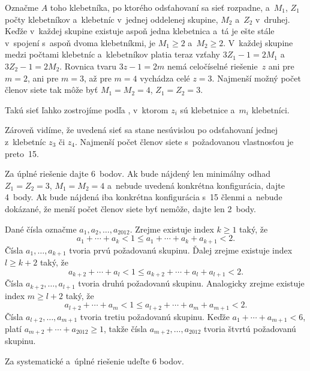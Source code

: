 {%
Označme $A$ toho klebetníka, po ktorého odsťahovaní sa sieť rozpadne, a~$M_1$, $Z_1$
počty klebetníkov a~klebetníc v~jednej oddelenej skupine, $M_2$ a~$Z_2$ v~druhej.
Keďže v~každej skupine existuje aspoň jedna klebetnica a~tá je
ešte stále v~spojení s~aspoň dvoma klebetníkmi, je
$M_1\ge2$ a~$M_2\ge2$. V~každej skupine medzi počtami klebetníc a~klebetníkov
platia teraz vzťahy $3Z_1-1=2M_1$ a~$3Z_2-1=2M_2$. Rovnica tvaru $3z-1=2m$
nemá celočíselné riešenie~$z$ ani pre $m=2$, ani pre
$m=3$, až pre $m=4$ vychádza celé $z=3$.
Najmenší možný počet členov siete tak môže byť $M_1=M_2=4$, $Z_1=Z_2=3$.

Takú sieť ľahko zostrojíme podľa \obr, v~ktorom
$z_i$ sú klebetnice a~$m_i$ klebetníci.
%

Zároveň vidíme, že uvedená sieť sa stane nesúvislou po odsťahovaní jednej z~klebetníc $z_3$
či $z_4$. Najmenší počet členov siete s~požadovanou vlastnosťou je preto~15.

\nobreak\medskip\petit\noindent
Za úplné riešenie dajte 6~bodov.
Ak bude nájdený len minimálny odhad $Z_1=Z_2=3$, $M_1=M_2=4$
a~nebude uvedená konkrétna konfigurácia, dajte 4~body. Ak bude nájdená
iba konkrétna konfigurácia s~15 členmi a~nebude dokázané, že menší počet členov siete
byť nemôže, dajte len 2~body.
\endpetit
\bigbreak
}

{%
Dané čísla označme $a_1, a_2, \dots , a_{2012}$.
Zrejme existuje index $k\ge1$ taký, že
$$
a_1+ \cdots +a_k < 1 \le a_1+ \cdots +a_k+a_{k+1} < 2.
$$
Čísla $a_1, \dots, a_{k+1}$ tvoria prvú požadovanú skupinu. Ďalej
zrejme existuje index $l\ge {k+2}$ taký, že
$$
a_{k+2}+ \cdots +a_l < 1 \le a_{k+2}+ \cdots +a_l+a_{l+1} <2.
$$
Čísla $a_{k+2}, \dots, a_{l+1}$ tvoria druhú požadovanú skupinu.
Analogicky zrejme existuje index $m\ge l+2$ taký, že
$$
a_{l+2}+ \cdots +a_m < 1 \le a_{l+2}+ \cdots +a_m+a_{m+1} <2.
$$
Čísla $a_{l+2}, \dots, a_{m+1}$ tvoria tretiu požadovanú skupinu.
Keďže $a_1+ \cdots +a_{m+1} < 6$, platí $a_{m+2}+ \cdots +a_{2012} \ge 1$,
takže čísla $a_{m+2},\dots , a_{2012}$ tvoria štvrtú požadovanú skupinu.

\nobreak\medskip\petit\noindent
Za systematické a~úplné riešenie udeľte 6 bodov.
\endpetit
\bigbreak
}

